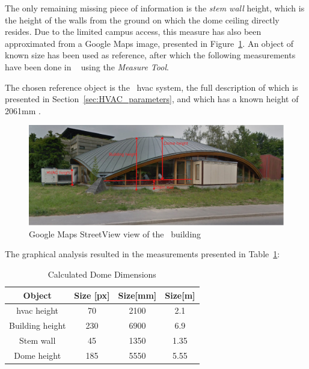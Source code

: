 The only remaining missing piece of information is the \textit{stem wall}
height, which is the height of the walls from the ground on which the dome
ceiling directly resides. Due to the limited campus access, this measure has
also been approximated from a Google Maps image, presented in
Figure~\ref{fig:Google_Maps_Streetview}. An object of known size has been used
as reference, after which the following measurements have been done in
~\cite{kimballGIMPGNUImage} using the
\textit{Measure Tool}.

The chosen reference object is the \pdome\ \acrshort{hvac} system, the full
description of which is presented in Section~\ref{sec:HVAC_parameters}, and
which has a known height of 2061mm \cite{aermecRoofTopManuelSelection}.

\clearpage

\begin{figure}[ht]
    \centering
    \includegraphics[width = \textwidth]{Images/polydome_streetview_annotated}
    \caption{Google Maps StreetView view of the \pdome\ building}
    \label{fig:Google_Maps_Streetview}
\end{figure}

The graphical analysis resulted in the measurements presented in
Table~\ref{tab:GIMP_measurements}:

\begin{table}[ht]
\centering
    \begin{tabular}{||c c c c||}
        \hline
        Object & Size [px] & Size[mm] & Size[m]\\
        \hline \hline
        \acrshort{hvac} height & 70 & 2100 & 2.1 \\
        Building height & 230 & 6900 & 6.9 \\
        Stem wall & 45 & 1350 & 1.35 \\
        Dome height & 185 & 5550 & 5.55 \\
        \hline
    \end{tabular}
\caption{Calculated Dome Dimensions}
\label{tab:GIMP_measurements}
\end{table}

